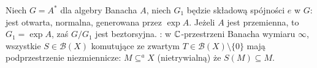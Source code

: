 Niech  $G = A^*$  dla algebry Banacha $A$, niech $G_1$ będzie składową spójności $e$ w $G$: jest otwarta, normalna, generowana przez $\exp A$.
Jeżeli $A$ jest przemienna, to $G_1 = \exp A$, zaś $G/G_1$ jest beztorsyjna.
: w $\mathbb{C}$-przestrzeni Banacha wymiaru $\infty$, wszystkie $S \in \mathcal B(X)$ komutujące ze zwartym $T \in \mathcal B(X) \setminus \{0\}$ mają podprzestrzenie niezmiennicze: $M \subseteq^a X$ (nietrywialną) że $S(M) \subseteq M$.